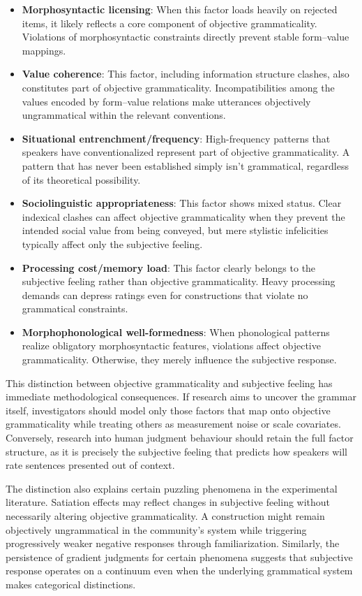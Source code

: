 \documentclass[12pt,letterpaper]{article}
\begin{document}
\begin{itemize}
\item \textbf{Morphosyntactic licensing}: When this factor loads heavily on rejected items, it likely reflects a core component of objective grammaticality. Violations of morphosyntactic constraints directly prevent stable form--value mappings.
\item \textbf{Value coherence}: This factor, including information structure clashes, also constitutes part of objective grammaticality. Incompatibilities among the values encoded by form--value relations make utterances objectively ungrammatical within the relevant conventions.
\item \textbf{Situational entrenchment/frequency}: High-frequency patterns that speakers have conventionalized represent part of objective grammaticality. A pattern that has never been established simply isn't grammatical, regardless of its theoretical possibility.
\item \textbf{Sociolinguistic appropriateness}: This factor shows mixed status. Clear indexical clashes can affect objective grammaticality when they prevent the intended social value from being conveyed, but mere stylistic infelicities typically affect only the subjective feeling.
\item \textbf{Processing cost/memory load}: This factor clearly belongs to the subjective feeling rather than objective grammaticality. Heavy processing demands can depress ratings even for constructions that violate no grammatical constraints.
\item \textbf{Morphophonological well-formedness}: When phonological patterns realize obligatory morphosyntactic features, violations affect objective grammaticality. Otherwise, they merely influence the subjective response.
\end{itemize}

This distinction between objective grammaticality and subjective feeling has immediate methodological consequences. If research aims to uncover the grammar itself, investigators should model only those factors that map onto objective grammaticality while treating others as measurement noise or scale covariates. Conversely, research into human judgment behaviour should retain the full factor structure, as it is precisely the subjective feeling that predicts how speakers will rate sentences presented out of context.

The distinction also explains certain puzzling phenomena in the experimental literature. Satiation effects may reflect changes in subjective feeling without necessarily altering objective grammaticality. A construction might remain objectively ungrammatical in the community's system while triggering progressively weaker negative responses through familiarization. Similarly, the persistence of gradient judgments for certain phenomena suggests that subjective response operates on a continuum even when the underlying grammatical system makes categorical distinctions.
\end{document}
